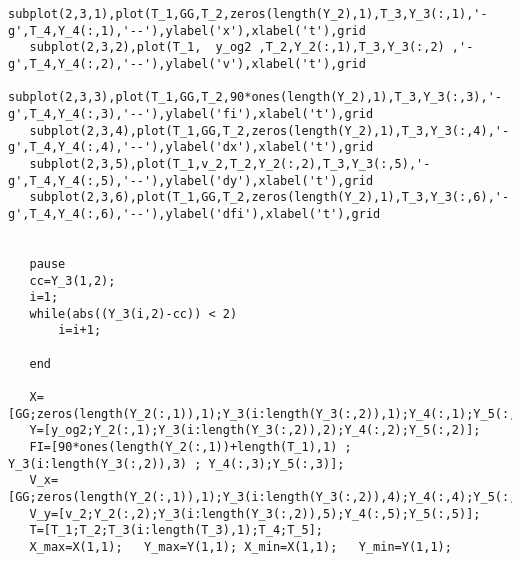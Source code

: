 \documentclass[UTF8]{article}
\begin{document}
\begin{appendix}
\begin{lstlisting}[title=main.m, frame=shadowbox]
   subplot(2,3,1),plot(T_1,GG,T_2,zeros(length(Y_2),1),T_3,Y_3(:,1),'-g',T_4,Y_4(:,1),'--'),ylabel('x'),xlabel('t'),grid
   subplot(2,3,2),plot(T_1,  y_og2 ,T_2,Y_2(:,1),T_3,Y_3(:,2) ,'-g',T_4,Y_4(:,2),'--'),ylabel('v'),xlabel('t'),grid
   subplot(2,3,3),plot(T_1,GG,T_2,90*ones(length(Y_2),1),T_3,Y_3(:,3),'-g',T_4,Y_4(:,3),'--'),ylabel('fi'),xlabel('t'),grid   
   subplot(2,3,4),plot(T_1,GG,T_2,zeros(length(Y_2),1),T_3,Y_3(:,4),'-g',T_4,Y_4(:,4),'--'),ylabel('dx'),xlabel('t'),grid
   subplot(2,3,5),plot(T_1,v_2,T_2,Y_2(:,2),T_3,Y_3(:,5),'-g',T_4,Y_4(:,5),'--'),ylabel('dy'),xlabel('t'),grid
   subplot(2,3,6),plot(T_1,GG,T_2,zeros(length(Y_2),1),T_3,Y_3(:,6),'-g',T_4,Y_4(:,6),'--'),ylabel('dfi'),xlabel('t'),grid


   pause
   cc=Y_3(1,2);
   i=1;
   while(abs((Y_3(i,2)-cc)) < 2)
       i=i+1;
       
   end
 
   X=[GG;zeros(length(Y_2(:,1)),1);Y_3(i:length(Y_3(:,2)),1);Y_4(:,1);Y_5(:,1)];
   Y=[y_og2;Y_2(:,1);Y_3(i:length(Y_3(:,2)),2);Y_4(:,2);Y_5(:,2)];
   FI=[90*ones(length(Y_2(:,1))+length(T_1),1) ; Y_3(i:length(Y_3(:,2)),3) ; Y_4(:,3);Y_5(:,3)];
   V_x=[GG;zeros(length(Y_2(:,1)),1);Y_3(i:length(Y_3(:,2)),4);Y_4(:,4);Y_5(:,4)];
   V_y=[v_2;Y_2(:,2);Y_3(i:length(Y_3(:,2)),5);Y_4(:,5);Y_5(:,5)];
   T=[T_1;T_2;T_3(i:length(T_3),1);T_4;T_5];
   X_max=X(1,1);   Y_max=Y(1,1); X_min=X(1,1);   Y_min=Y(1,1);
   

\end{lstlisting}
\end{appendix}
\end{document}
